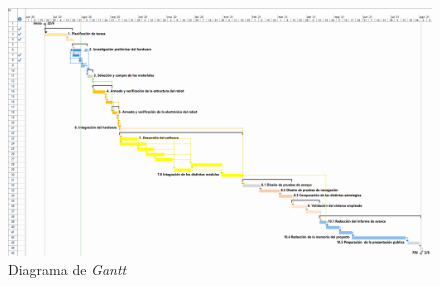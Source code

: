 \documentclass[11pt]{charter}
\begin{document}



\newpage
\begin{landscape}
\begin{figure}[htpb]
\includegraphics[width=1.6\textwidth]{./Figuras/Gantt.png}
\caption{Diagrama de \textit{Gantt}}
\label{fig:Gantt}
\end{figure}
\end{landscape}
\end{document}
